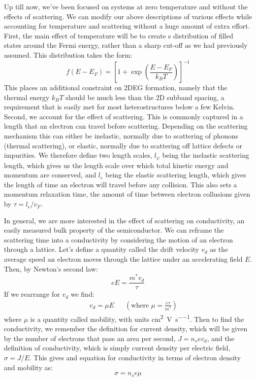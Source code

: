 Up till now, we've been focused on systems at zero temperature and without the effects of scattering. We can modify our above
descriptions of various effects while accounting for temperature and scattering without a huge amount of extra effort.
First, the main effect of temperature will be to create s distribution of filled states around the Fermi energy, rather
than a sharp cut-off as we had previously assumed. This distribution takes the form:
\begin{equation}
  f(E - E_F) = \left[1 + \exp\left(\frac{E - E_F}{k_B T}\right)\right]^{-1}
\end{equation}
This places an additional constraint on 2DEG formation, namely that the thermal energy $k_B T$ should be much less than the
2D subband spacing, a requirement that is easily met for most heterostructures below a few Kelvin. Second, we account for the
effect of scattering. This is commonly captured in a length that an electron can travel before scattering. Depending on the scattering
mechanism this can either be inelastic, normally due to scattering of phonons (thermal scattering), or elastic, normally due to
scattering off lattice defects or impurities. We therefore define two length scales, $l_\psi$ being the inelastic scattering length,
which gives us the length scale over which total kinetic energy and momentum are conserved, and $l_e$ being the elastic scattering
length, which gives the length of time an electron will travel before any collision. This also sets a momentum relaxation time, the
amount of time between electron collusions given by $\tau = l_e/v_F$.

In general, we are more interested in the effect of scattering on conductivity, an easily measured bulk property of
the semiconductor. We can reframe the scattering time into a conductivity by considering the motion of an electron
through a lattice. Let's define a quantity called the drift velocity $v_d$ as the average speed an electron moves through
the lattice under an accelerating field $E$. Then, by Newton's second law:
\begin{equation}
  eE = \frac{m^* v_d}{\tau}
\end{equation}
If we rearrange for $v_d$ we find:
\begin{align}
  && v_d = \mu E && (\textrm{where~} \mu = \frac{e \tau}{m^*})
\end{align}
where $\mu$ is a quantity called mobility, with units \si{\square\centi\meter\per\volt\per\second}.
Then to find the conductivity, we remember the definition for current
density, which will be given by the number of electrons that pass an area per second, $J = n_s e v_d$, and the definition
of conductivity, which is simply current density per electric field, $\sigma = J/E$. This gives and equation for conductivity
in terms of electron density and mobility as:
\begin{equation}
  \sigma = n_s e \mu
\end{equation}

